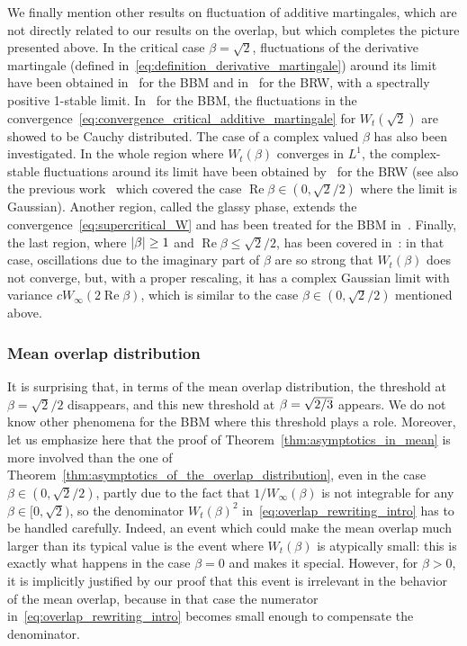\documentclass[AHL,Unicode,longabstracts,published]{cedram}
\DeclareMathOperator{\re}{Re}
\newcommand\1{\mathds{1}}
\newcommand{\abs}[1]{\left\lvert#1\right\rvert}
\let\originalleft\left
\let\originalright\right
\renewcommand{\left}{\mathopen{}\mathclose\bgroup\originalleft}
\renewcommand{\right}{\aftergroup\egroup\originalright}
\begin{document}
We finally mention other results on fluctuation of additive martingales, which are not directly related to our results on the overlap, but which completes the picture presented above. In the critical case $\beta=\sqrt{2}$, fluctuations of the derivative martingale (defined in~\eqref{eq:definition_derivative_martingale}) around its limit have been obtained in~\cite{MaillardPain2019} for the BBM and in~\cite{BuraczewskiIksanovMallein2021,HouRenSong2024} for the BRW, with a spectrally positive 1-stable limit. In~\cite{MaillardPain2021} for the BBM, the fluctuations in the convergence~\eqref{eq:convergence_critical_additive_martingale} for $W_t(\sqrt{2})$ are showed to be Cauchy distributed. The case of a complex valued $\beta$ has also been investigated. In the whole region where $W_t(\beta)$ converges in $L^1$, the complex-stable fluctuations around its limit have been obtained by~\cite{IksanovKoleskoMeiners2020} for the BRW (see also the previous work~\cite{HartungKlimovsky2018} which covered the case $\re\beta \in (0,\sqrt{2}/2)$ where the limit is Gaussian). Another region, called the glassy phase, extends the convergence~\eqref{eq:supercritical_W} and has been treated for the BBM in~\cite{HartungKlimovsky2015,MadauleRhodesVargas2015}. Finally, the last region, where $\abs{\beta} \geq 1$ and $\re\beta \leq \sqrt{2}/2$, has been covered in~\cite{HartungKlimovsky2018}: in that case, oscillations due to\pagebreak{} the imaginary part of $\beta$ are so strong that $W_t(\beta)$ does not converge, but, with a proper rescaling, it has a complex Gaussian limit with variance $c W_\infty(2\re\beta)$, which is similar to the case $\beta \in (0,\sqrt{2}/2)$ mentioned above.

\subsubsection*{Mean overlap distribution}
It is surprising that, in terms of the mean overlap distribution, the threshold at $\beta = \sqrt{2}/2$ disappears, and this new threshold at $\beta = \sqrt{2\smash{/}3}$ appears. We do not know other phenomena for the BBM where this threshold plays a role. Moreover, let us emphasize here that the proof of Theorem~\ref{thm:asymptotics_in_mean} is more involved than the one of Theorem~\ref{thm:asymptotics_of_the_overlap_distribution}, even in the case $\beta \in (0,\sqrt{2}/2)$, partly due to the fact that $1/W_\infty(\beta)$ is not integrable for any $\beta \in [0,\sqrt{2})$, so the denominator $W_t(\beta)^2$ in~\eqref{eq:overlap_rewriting_intro} has to be handled carefully. Indeed, an event which could make the mean overlap much larger than its typical value is the event where $W_t(\beta)$ is atypically small: this is exactly what happens in the case $\beta=0$ and makes it special. However, for $\beta>0$, it is implicitly justified by our proof that this event is irrelevant in the behavior of the mean overlap, because in that case the numerator in~\eqref{eq:overlap_rewriting_intro} becomes small enough to compensate the denominator.
\end{document}
